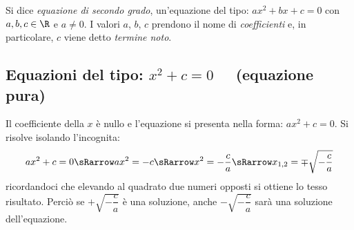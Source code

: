 \begin{definizione}{}{}
Si dice \emph{equazione di secondo grado}, un'equazione del tipo: 
\(ax^2 +bx +c = 0\) con \(a, b, c \in \R\) e \(a \neq 0\). 
I valori \(a\), \(b\), \(c\) prendono il nome di \emph{coefficienti} e, in 
particolare, \(c\) viene detto \emph{termine noto}.
\end{definizione}


%

\subsection{Equazioni del tipo: \(x^2 +c = 0\)~~ (equazione pura)}
Il coefficiente della \(x\) è nullo e l'equazione si presenta nella forma: 
\(ax^2 +c = 0\).
Si risolve isolando l'incognita:
\[ax^2 +c = 0 \sRarrow ax^2 = -c \sRarrow x^2 = -\dfrac{c}{a} \sRarrow 
x_{1,2}=\mp \sqrt{-\dfrac{c}{a}}\]
ricordandoci che elevando al quadrato due numeri opposti si ottiene lo 
tesso risultato. 
Perciò se  \(+\sqrt{-\dfrac{c}{a}}\) è una soluzione, anche 
\(-\sqrt{-\dfrac{c}{a}}\) sarà una soluzione dell'equazione.

